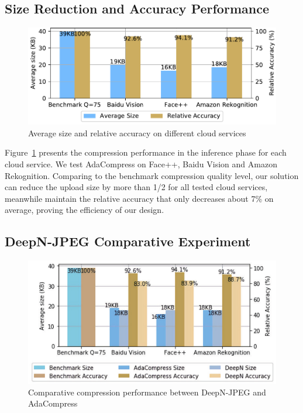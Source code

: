 \subsection{Size Reduction and Accuracy Performance}

\begin{figure}[!t]
	\includegraphics[width=0.8\linewidth]{figures/compress-performance.pdf}
	\caption{Average size and relative accuracy on different cloud services}
	\label{fig: compress_performance}
\end{figure}

Figure~\ref{fig: compress_performance} presents the compression performance in the inference phase for each cloud service. We test AdaCompress on Face++, Baidu Vision and Amazon Rekognition. Comparing to the benchmark compression quality level, our solution can reduce the upload size by more than 1/2 for all tested cloud services, meanwhile maintain the relative accuracy that only decreases about 7\% on average, proving the efficiency of our design. %

\subsection{DeepN-JPEG Comparative Experiment}

\begin{figure}[!t]
	\includegraphics[width=0.8\linewidth]{figures/compare_DeepN.pdf}
	\caption{Comparative compression performance between DeepN-JPEG and AdaCompress}
	\label{fig: compare_DeepN}
\end{figure}

